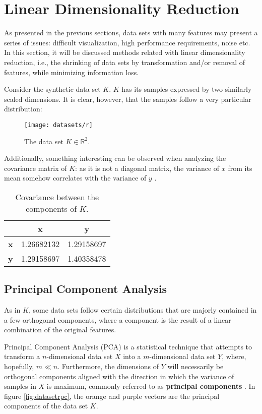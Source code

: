 \chapter{Linear Dimensionality Reduction}

As presented in the previous sections, data sets with many features may present a series of issues: difficult visualization, high performance requirements, noise etc. In this section, it will be discussed methods related with linear dimensionality reduction, i.e., the shrinking of data sets by transformation and/or removal of features, while minimizing information loss.

Consider the synthetic data set $K$. $K$ has its samples expressed by two similarly scaled dimensions. It is clear, however, that the samples follow a very particular distribution:

\begin{figure}[H]
    \centering
	\captionsetup{justification=centering}

	\texttt{[image: datasets/r]}
	\caption{The data set $K \in \mathbb{R}^2$.}
	\label{fig:datasetr}
\end{figure}

Additionally, something interesting can be observed when analyzing the covariance matrix of $K$: as it is not a diagonal matrix, the variance of $x$ from its mean somehow correlates with the variance of $y$ \cite{pcajon2003}.

\begin{table}[H]
	\centering
	\begin{tabular}{|c|c|c|}
		\hline
			& \textbf{x} & \textbf{y} \\\hline
		\textbf{x} & 1.26682132  & 1.29158697 \\\hline
		\textbf{y} & 1.29158697  & 1.40358478 \\\hline
	\end{tabular}
	\caption{Covariance between the components of $K$.}
\end{table}

\section{Principal Component Analysis}

As in $K$, some data sets follow certain distributions that are majorly contained in a few orthogonal components, where a component is the result of a linear combination of the original features.

Principal Component Analysis (PCA) is a statistical technique that attempts to transform a $n$-dimensional data set $X$ into a $m$-dimensional data set $Y$, where, hopefully, $m \ll n$. Furthermore, the dimensions of $Y$ will necessarily be orthogonal components aligned with the direction in which the variance of samples in $X$ is maximum, commonly referred to as \textbf{principal components} \cite{pca1989}. In figure \ref{fig:datasetrpc}, the orange and purple vectors are the principal components of the data set $K$.

